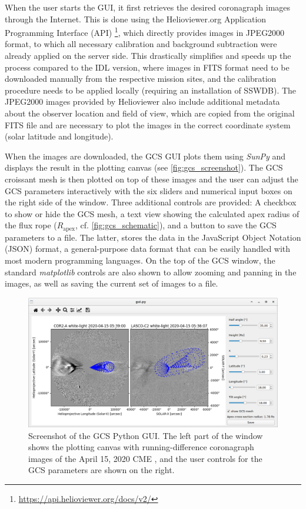 When the user starts the GUI, it first retrieves the desired coronagraph images through the Internet. This is done using the Helioviewer.org Application Programming Interface (API) \footnote{\url{https://api.helioviewer.org/docs/v2/}}, which directly provides images in JPEG2000 format, to which all necessary calibration and background subtraction were already applied on the server side. This drastically simplifies and speeds up the process compared to the IDL version, where images in FITS format need to be downloaded manually from the respective mission sites, and the calibration procedure needs to be applied locally (requiring an installation of SSWDB). The JPEG2000 images provided by Helioviewer also include additional metadata about the observer location and field of view, which are copied from the original FITS file and are necessary to plot the images in the correct coordinate system (solar latitude and longitude).

When the images are downloaded, the GCS GUI plots them using \textit{SunPy} and displays the result in the plotting canvas (see \autoref{fig:gcs_screenshot}). The GCS croissant mesh is then plotted on top of these images and the user can adjust the GCS parameters interactively with the six sliders and numerical input boxes on the right side of the window. Three additional controls are provided: A checkbox to show or hide the GCS mesh, a text view showing the calculated apex radius of the flux rope ($R_\text{apex}$, cf. \autoref{fig:gcs_schematic}), and a button to save the GCS parameters to a file. The latter, stores the data in the JavaScript Object Notation (JSON) format, a general-purpose data format that can be easily handled with most modern programming languages. On the top of the GCS window, the standard \textit{matplotlib} controls are also shown to allow zooming and panning in the images, as well as saving the current set of images to a file.

\begin{figure}
	\centering
	\includegraphics[width=\textwidth]{images/gcs_screenshot.png}
	\caption[Screenshot of the GCS Python GUI]{Screenshot of the GCS Python GUI. The left part of the window shows the plotting canvas with running-difference coronagraph images of the April 15, 2020 CME \citep[see][]{Forstner-2021-SolO}, and the user controls for the GCS parameters are shown on the right.}
	\label{fig:gcs_screenshot}
\end{figure}


